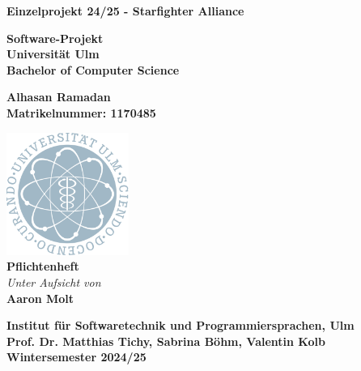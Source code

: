 \documentclass[10pt]{article}
\begin{document}
\thispagestyle{empty}

\begin{titlepage}
	\begin{center}
		\begin{LARGE}
		\bf{Einzelprojekt 24/25 - Starfighter Alliance\\}
		\end{LARGE}
		\vspace{40pt}
		
		\vspace{15pt}
		\textbf{\Large Software-Projekt\\}
		\vspace{6pt}
		\textbf{\Large Universität Ulm}\\
		\vspace{6pt}
		\textbf{\Large Bachelor of Computer Science}\\
		\vspace{20pt}
		
		\textbf{\large
			Alhasan Ramadan\\
			Matrikelnummer: 1170485}
		\vspace{40pt}
		
		\includegraphics[width=0.3\textwidth]{./1200px-Uni_Ulm_Logo_Ausschnitt.svg.png} \\[45pt]
		
		\vspace{35pt} %
		\textbf{\Large Pflichtenheft}\\
		\textit{Unter Aufsicht von}\\
		\textbf{\large Aaron Molt}\\
		
		
		\vspace{40pt}
		
		
		\textbf{\large Institut für Softwaretechnik und Programmiersprachen, Ulm\\
			Prof. Dr. Matthias Tichy, Sabrina Böhm, Valentin Kolb\\
			Wintersemester 2024/25
		}\\
	\end{center}
\end{titlepage}
\end{document}
